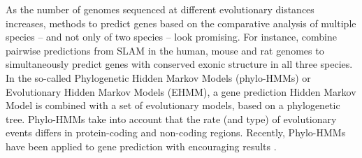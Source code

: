 
As the number of genomes sequenced at different evolutionary distances
increases, methods to predict genes based on the comparative analysis
of multiple species -- and not only of two species -- look
promising. For instance, \cite{dewey:2004a} combine pairwise
predictions from SLAM in the human, mouse and rat genomes to
simultaneously predict genes with conserved exonic structure in all
three species. In the so-called Phylogenetic Hidden Markov Models
(phylo-HMMs) or Evolutionary Hidden Markov Models (EHMM), a gene
prediction Hidden Markov Model is combined with a set of evolutionary
models, based on a phylogenetic tree. Phylo-HMMs take into account
that the rate (and type) of evolutionary events differs in
protein-coding and non-coding regions. Recently, Phylo-HMMs have been
applied to gene prediction with encouraging results
\citep{pedersen:2003a, siepel:2004a}.

